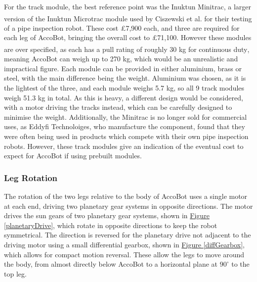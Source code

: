 \documentclass[11pt]{article}		%
\newcommand{\supercite}[1]{\textsuperscript{\cite{#1}}}		%
\newcommand{\figref}[1]{\hyperref[#1]{Figure \ref*{#1}}}    %
\begin{document}
				For the track module, the best reference point was the Inuktun Minitrac, a larger version of the Inuktun Microtrac module used by Ciszewski et al.\supercite{ciszewski2015design} for their testing of a pipe inspection robot.
				These cost £7,900 each, and three are required for each leg of AccoBot, bringing the overall cost to £71,100.
				However these modules are over specified, as each has a pull rating of roughly 30 kg for continuous duty\supercite{inuktunTracks}, meaning AccoBot can weigh up to 270 kg, which would be an unrealistic and impractical figure.
				Each module can be provided in either aluminium, brass or steel, with the main difference being the weight.
				Aluminium was chosen, as it is the lightest of the three, and each module weighs 5.7 kg, so all 9 track modules weigh 51.3 kg in total.
				As this is heavy, a different design would be considered, with a motor driving the tracks instead, which can be carefully designed to minimise the weight.
				Additionally, the Minitrac is no longer sold for commercial uses, as Eddyfi Technoloiges, who manufacture the component, found that they were often being used in products which compete with their own pipe inspection robots.
				However, these track modules give an indication of the eventual cost to expect for AccoBot if using prebuilt modules.
				
			\subsubsection{Leg Rotation}
				
				The rotation of the two legs relative to the body of AccoBot uses a single motor at each end, driving two planetary gear systems in opposite directions.
				The motor drives the sun gears of two planetary gear systems, shown in \figref{planetaryDrive}, which rotate in opposite directions to keep the robot symmetrical.
				The direction is reversed for the planetary drive not adjacent to the driving motor using a small differential gearbox, shown in \figref{diffGearbox}, which allows for compact motion reversal.
				These allow the legs to move around the body, from almost directly below AccoBot to a horizontal plane at $90^\circ$ to the top leg.
				
\end{document}
